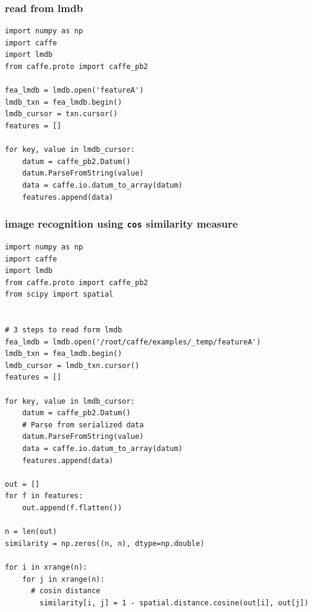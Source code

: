 \documentclass[11pt]{article}
\begin{document}
\subsubsection{read from lmdb}
\label{sec:orgheadline3}
\begin{verbatim}
import numpy as np
import caffe
import lmdb
from caffe.proto import caffe_pb2

fea_lmdb = lmdb.open('featureA')
lmdb_txn = fea_lmdb.begin()
lmdb_cursor = txn.cursor()
features = []

for key, value in lmdb_cursor:
    datum = caffe_pb2.Datum()
    datum.ParseFromString(value)
    data = caffe.io.datum_to_array(datum)
    features.append(data)
\end{verbatim}
\subsubsection{image recognition using \texttt{cos} similarity measure}
\label{sec:orgheadline4}
\begin{verbatim}
import numpy as np
import caffe
import lmdb
from caffe.proto import caffe_pb2
from scipy import spatial


# 3 steps to read form lmdb
fea_lmdb = lmdb.open('/root/caffe/examples/_temp/featureA')
lmdb_txn = fea_lmdb.begin()
lmdb_cursor = lmdb_txn.cursor()
features = []

for key, value in lmdb_cursor:
    datum = caffe_pb2.Datum()
    # Parse from serialized data
    datum.ParseFromString(value)
    data = caffe.io.datum_to_array(datum)
    features.append(data)

out = []
for f in features:
    out.append(f.flatten())

n = len(out)
similarity = np.zeros((n, n), dtype=np.double)

for i in xrange(n):
    for j in xrange(n):
      # cosin distance
        similarity[i, j] = 1 - spatial.distance.cosine(out[i], out[j])
\end{verbatim}
\end{document}

